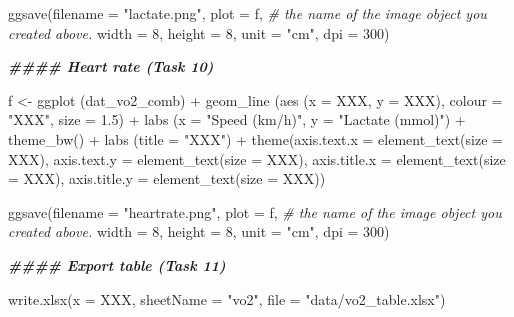 \documentclass[
]{book}
\newenvironment{Shaded}{\begin{snugshade}}{\end{snugshade}}
\newcommand{\AttributeTok}[1]{\textcolor[rgb]{0.77,0.63,0.00}{#1}}
\newcommand{\CommentTok}[1]{\textcolor[rgb]{0.56,0.35,0.01}{\textit{#1}}}
\newcommand{\DecValTok}[1]{\textcolor[rgb]{0.00,0.00,0.81}{#1}}
\newcommand{\DocumentationTok}[1]{\textcolor[rgb]{0.56,0.35,0.01}{\textbf{\textit{#1}}}}
\newcommand{\FloatTok}[1]{\textcolor[rgb]{0.00,0.00,0.81}{#1}}
\newcommand{\FunctionTok}[1]{\textcolor[rgb]{0.00,0.00,0.00}{#1}}
\newcommand{\NormalTok}[1]{#1}
\newcommand{\OtherTok}[1]{\textcolor[rgb]{0.56,0.35,0.01}{#1}}
\newcommand{\SpecialCharTok}[1]{\textcolor[rgb]{0.00,0.00,0.00}{#1}}
\newcommand{\StringTok}[1]{\textcolor[rgb]{0.31,0.60,0.02}{#1}}
\begin{document}
\begin{Shaded}
\begin{Highlighting}[]
\FunctionTok{ggsave}\NormalTok{(}\AttributeTok{filename =} \StringTok{"lactate.png"}\NormalTok{, }
       \AttributeTok{plot =}\NormalTok{ f, }\CommentTok{\# the name of the image object you created above.}
       \AttributeTok{width =} \DecValTok{8}\NormalTok{, }
       \AttributeTok{height =} \DecValTok{8}\NormalTok{, }
       \AttributeTok{unit =} \StringTok{"cm"}\NormalTok{, }
       \AttributeTok{dpi =} \DecValTok{300}\NormalTok{)}

\DocumentationTok{\#\#\#\# Heart rate (Task 10)}

\NormalTok{f }\OtherTok{\textless{}{-}} \FunctionTok{ggplot}\NormalTok{ (dat\_vo2\_comb) }\SpecialCharTok{+}
  \FunctionTok{geom\_line}\NormalTok{ (}\FunctionTok{aes}\NormalTok{ (}\AttributeTok{x =}\NormalTok{ XXX, }\AttributeTok{y =}\NormalTok{ XXX), }\AttributeTok{colour =} \StringTok{"XXX"}\NormalTok{, }\AttributeTok{size =} \FloatTok{1.5}\NormalTok{) }\SpecialCharTok{+} 
  \FunctionTok{labs}\NormalTok{ (}\AttributeTok{x =} \StringTok{"Speed (km/h)"}\NormalTok{,}
        \AttributeTok{y =} \StringTok{"Lactate (mmol)"}\NormalTok{) }\SpecialCharTok{+}
  \FunctionTok{theme\_bw}\NormalTok{() }\SpecialCharTok{+} 
  \FunctionTok{labs}\NormalTok{ (}\AttributeTok{title =} \StringTok{"XXX"}\NormalTok{) }\SpecialCharTok{+} 
  \FunctionTok{theme}\NormalTok{(}\AttributeTok{axis.text.x =} \FunctionTok{element\_text}\NormalTok{(}\AttributeTok{size =}\NormalTok{ XXX),}
        \AttributeTok{axis.text.y =} \FunctionTok{element\_text}\NormalTok{(}\AttributeTok{size =}\NormalTok{ XXX),  }
        \AttributeTok{axis.title.x =} \FunctionTok{element\_text}\NormalTok{(}\AttributeTok{size =}\NormalTok{ XXX),}
        \AttributeTok{axis.title.y =} \FunctionTok{element\_text}\NormalTok{(}\AttributeTok{size =}\NormalTok{ XXX))}

\FunctionTok{ggsave}\NormalTok{(}\AttributeTok{filename =} \StringTok{"heartrate.png"}\NormalTok{, }
       \AttributeTok{plot =}\NormalTok{ f, }\CommentTok{\# the name of the image object you created above.}
       \AttributeTok{width =} \DecValTok{8}\NormalTok{, }
       \AttributeTok{height =} \DecValTok{8}\NormalTok{, }
       \AttributeTok{unit =} \StringTok{"cm"}\NormalTok{, }
       \AttributeTok{dpi =} \DecValTok{300}\NormalTok{)}

\DocumentationTok{\#\#\#\# Export table (Task 11)}

\FunctionTok{write.xlsx}\NormalTok{(}\AttributeTok{x =}\NormalTok{ XXX,}
           \AttributeTok{sheetName =} \StringTok{"vo2"}\NormalTok{,}
           \AttributeTok{file =} \StringTok{"data/vo2\_table.xlsx"}\NormalTok{)}


\end{Highlighting}
\end{Shaded}
\end{document}
